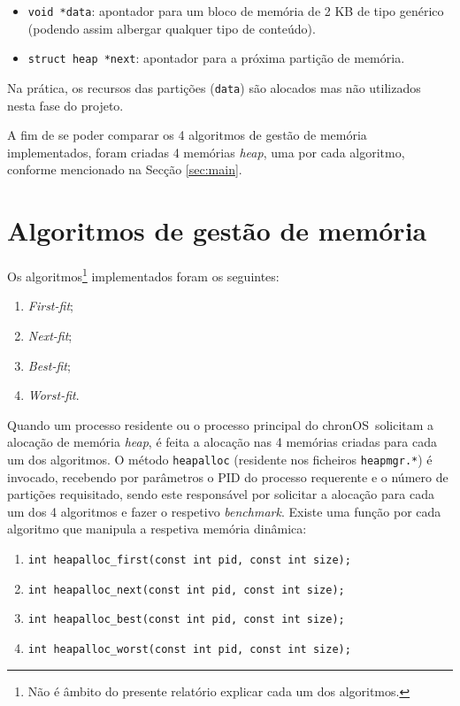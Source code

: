 \documentclass[10pt,oneside]{estiloUBI}
\newcommand{\chronOS}{\textsf{chronOS}}
\newcounter{note}
\begin{document}
	\begin{itemize}
		\item \texttt{void *data}: apontador para um bloco de memória de 2 KB de tipo genérico (podendo assim albergar qualquer tipo de conteúdo).
		\item \texttt{struct heap *next}: apontador para a próxima partição de memória.
	\end{itemize}
	
	Na prática, os recursos das partições (\verb|data|) são alocados mas não utilizados nesta fase do projeto.
	
	A fim de se poder comparar os 4 algoritmos de gestão de memória implementados, foram criadas 4 memórias \textit{heap}, uma por cada algoritmo, conforme mencionado na Secção \ref{sec:main}.
	
	
	\section{Algoritmos de gestão de memória}
	\label{ssec:heap:algoithms}
	
	Os algoritmos\footnote{Não é âmbito do presente relatório explicar cada um dos algoritmos.} implementados foram os seguintes:
	
	\begin{enumerate}
		\item \textit{First-fit};
		\item \textit{Next-fit};
		\item \textit{Best-fit};
		\item \textit{Worst-fit}.
	\end{enumerate}

	Quando um processo residente ou o processo principal do \chronOS~solicitam a alocação de memória \textit{heap}, é feita a alocação nas 4 memórias criadas para cada um dos algoritmos. O método \verb|heapalloc| (residente nos ficheiros \verb|heapmgr.*|) é invocado, recebendo por parâmetros o PID do processo requerente e o número de partições requisitado, sendo este responsável por solicitar a alocação para cada um dos 4 algoritmos e fazer o respetivo \textit{benchmark}. Existe uma função por cada algoritmo que manipula a respetiva memória dinâmica:
	
	\begin{enumerate}
		\item \texttt{int heapalloc_first(const int pid, const int size);}
		\item \texttt{int heapalloc_next(const int pid, const int size);}
		\item \texttt{int heapalloc_best(const int pid, const int size);}
		\item \texttt{int heapalloc_worst(const int pid, const int size);}
	\end{enumerate}
	
\end{document}
